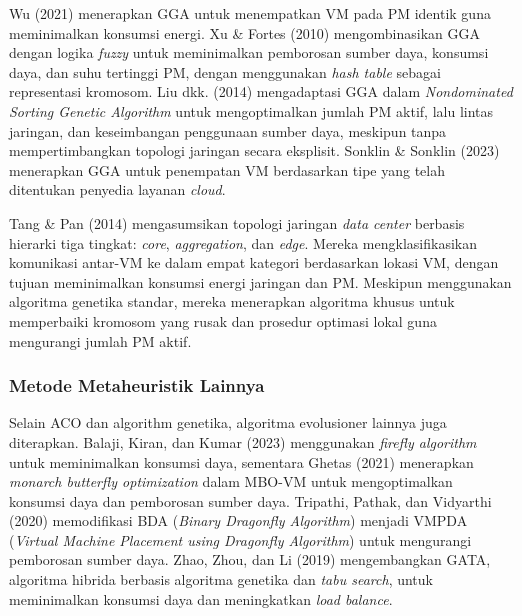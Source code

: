 Wu (2021) menerapkan GGA untuk menempatkan VM pada PM identik guna meminimalkan konsumsi energi. Xu \& Fortes (2010) mengombinasikan GGA dengan logika \textit{fuzzy} untuk meminimalkan pemborosan sumber daya, konsumsi daya, dan suhu tertinggi PM, dengan menggunakan \textit{hash table} sebagai representasi kromosom. Liu dkk. (2014) mengadaptasi GGA dalam \textit{Nondominated Sorting Genetic Algorithm} untuk mengoptimalkan jumlah PM aktif, lalu lintas jaringan, dan keseimbangan penggunaan sumber daya, meskipun tanpa mempertimbangkan topologi jaringan secara eksplisit. Sonklin \& Sonklin (2023) menerapkan GGA untuk penempatan VM berdasarkan tipe yang telah ditentukan penyedia layanan \textit{cloud}.

Tang \& Pan (2014) mengasumsikan topologi jaringan \textit{data center} berbasis hierarki tiga tingkat: \textit{core}, \textit{aggregation}, dan \textit{edge}. Mereka mengklasifikasikan komunikasi antar-VM ke dalam empat kategori berdasarkan lokasi VM, dengan tujuan meminimalkan konsumsi energi jaringan dan PM. Meskipun menggunakan algoritma genetika standar, mereka menerapkan algoritma khusus untuk memperbaiki kromosom yang rusak dan prosedur optimasi lokal guna mengurangi jumlah PM aktif.

\subsubsection{Metode Metaheuristik Lainnya}
Selain ACO dan algorithm genetika, algoritma evolusioner lainnya juga diterapkan. Balaji, Kiran, dan Kumar (2023) menggunakan \textit{firefly algorithm} untuk meminimalkan konsumsi daya, sementara Ghetas (2021) menerapkan \textit{monarch butterfly optimization} dalam MBO-VM untuk mengoptimalkan konsumsi daya dan pemborosan sumber daya. Tripathi, Pathak, dan Vidyarthi (2020) memodifikasi BDA (\textit{Binary Dragonfly Algorithm}) menjadi VMPDA (\textit{Virtual Machine Placement using Dragonfly Algorithm}) untuk mengurangi pemborosan sumber daya. Zhao, Zhou, dan Li (2019) mengembangkan GATA, algoritma hibrida berbasis algoritma genetika dan \textit{tabu search}, untuk meminimalkan konsumsi daya dan meningkatkan \textit{load balance}.


